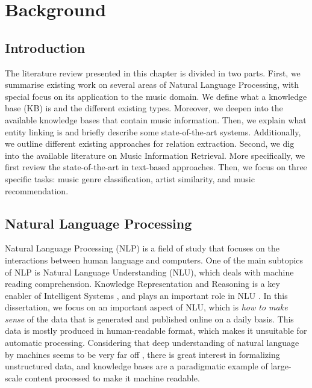 
\chapter{Background}
\label{sec:SOA}

\section{Introduction}
\label{sec:SOA:Introduction}

The literature review presented in this chapter is divided in two parts.
First, we summarise existing work on several areas of Natural Language Processing, with special focus on its application to the music domain. 
We define what a knowledge base (KB) is and the different existing types. Moreover, we deepen into the available knowledge bases that contain music information.
Then, we explain what entity linking is and briefly describe some state-of-the-art systems. Additionally, we outline different existing approaches for relation extraction. 
Second, we dig into the available literature on Music Information Retrieval. More specifically, we first review the state-of-the-art in text-based approaches. Then, we focus on three specific tasks: music genre classification, artist similarity, and music recommendation.


\section{Natural Language Processing}
\label{sec:SOA:nlu}

Natural Language Processing (NLP) is a field of study that focuses on the interactions between human language and computers. One of the main subtopics of NLP is Natural Language Understanding (NLU), which deals with machine reading comprehension.
Knowledge Representation and Reasoning is a key enabler of Intelligent Systems \citep{Suchaneketal2007}, and plays an important role in NLU \citep{BaralandDeGiacomo2015}.
In this dissertation, we focus on an important aspect of NLU, which is \textit{how to make sense} of the data that is generated and published online on a daily basis. This data is mostly produced in human-readable format, which makes it unsuitable for automatic processing. Considering that deep understanding of natural language by machines seems to be very far off \citep{CambriaandWhite2014}, there is great interest in formalizing unstructured data, and knowledge bases are a paradigmatic example of large-scale content processed to make it machine readable.

